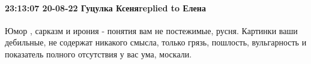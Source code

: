  
 
 
 
 

\paragraph{23:13:07 20-08-22 Гуцулка Ксеняreplied to Елена}

Юмор , сарказм и ирония - понятия вам не постежимые, русня. Картинки ваши
дебильные, не содержат никакого смысла, только грязь, пошлость, вульгарность и
показатель полного отсутствия у вас ума, москали.
